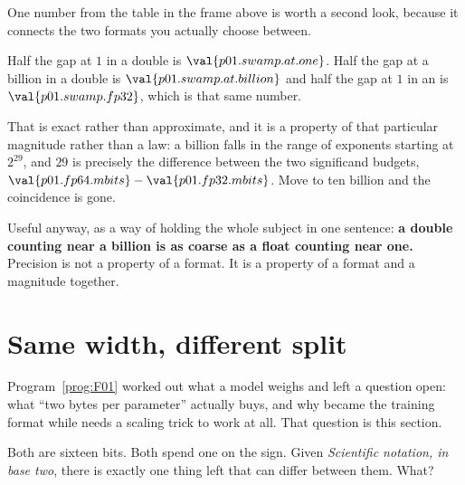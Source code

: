 \begin{fr}

One number from the table in the frame above is worth a second look, because
it connects the two formats you actually choose between.

Half the gap at $1$ in a double is $\val{p01.swamp.at.one}$. Half the gap at a
billion in a double is $\val{p01.swamp.at.billion}$ \dash{} and half the gap
at $1$ in an  is $\val{p01.swamp.fp32}$, which is that same number.

That is exact rather than approximate, and it is a property of that particular
magnitude rather than a law: a billion falls in the range of exponents
starting at $2^{29}$, and $29$ is precisely the difference between the two
significand budgets, $\val{p01.fp64.mbits} - \val{p01.fp32.mbits}$. Move to ten
billion and the coincidence is gone.

Useful anyway, as a way of holding the whole subject in one sentence:
\textbf{a double counting near a billion is as coarse as a float counting near
one.} Precision is not a property of a format. It is a property of a format
and a magnitude together.
\end{fr}

\section{Same width, different split}
\label{sec:P01-split}

\begin{fr}
Program~\ref{prog:F01} worked out what a model weighs and left a question
open: what \enquote{two bytes per parameter} actually buys, and why
 became the training format while  needs a scaling trick
to work at all. That question is this section.

Both are sixteen bits. Both spend one on the sign. Given \emph{Scientific notation, in base two}, there is
exactly one thing left that can differ between them. What?
\nextframe
\end{fr}

